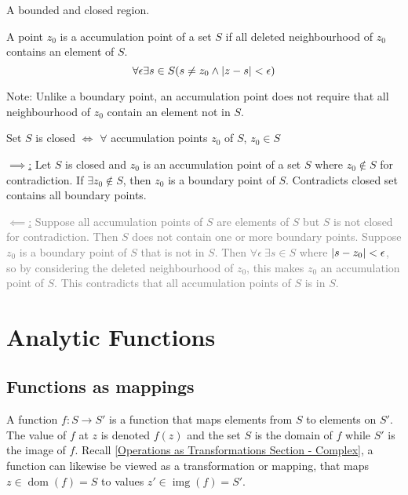 \documentclass[12pt, english]{book}
\makeatletter
\renewenvironment{proof}[1][\proofname]{\par
	\pushQED{\qed}%
	\normalfont \topsep6\p@\@plus6\p@\relax
	\list{}{%
		\settowidth{\leftmargin}{\itshape\proofname:\hskip\labelsep}%
		\setlength{\labelwidth}{0pt}%
		\setlength{\itemindent}{-\leftmargin}%
	}%
	\item[\hskip\labelsep\itshape#1\@addpunct{:}]\ignorespaces
}{%
	\popQED\endlist\@endpefalse
}
\makeatother
\begin{document}
	\begin{definition}
		A bounded and closed region.
	\end{definition}

	\begin{definition}
		\label{Accumulation/Limit Point Definition - Complex}
		A point $z_0$ is a accumulation point of a set $S$ if all deleted neighbourhood of $z_0$ contains an element of $S$. 
		$$\forall \epsilon \exists s \in S (s \neq z_0 \land \abs{z-s} < \epsilon)$$
	\end{definition}
	Note: Unlike a boundary point, an accumulation point does not require that all neighbourhood of $z_0$ contain an element not in $S$.
	
	\begin{theorem}
		Set $S$ is closed $\iff$ $\forall$ accumulation points $z_0$ of $S$, $z_0 \in S$
	\end{theorem}
	\begin{proof}
		\underline{$\implies$:}
		Let $S$ is closed and $z_0$ is an accumulation point of a set $S$ where $z_0 \notin S$ for contradiction. If $\exists z_0 \notin S$, then $z_0$ is a boundary point of $S$. Contradicts closed set contains all boundary points. 
		
		\textcolor{Grey}{
		\underline{$\impliedby$:}
		Suppose all accumulation points of $S$ are elements of $S$ but $S$ is not closed for contradiction. Then $S$ does not contain one or more boundary points. Suppose $z_0$ is a boundary point of $S$ that is not in $S$. Then $\forall \epsilon \ \exists s\in S$ where $\abs{s-z_0} < \epsilon$, so by considering the deleted neighbourhood of $z_0$, this makes $z_0$ an accumulation point of $S$. This contradicts that all accumulation points of $S$ is in $S$. 		
		}
	\end{proof}

	\chapter{Analytic Functions} \label{Analytic Functions Chapter - Complex}
	\section{Functions as mappings} \label{Functions as Mappings Section - Complex}
	A function $f: S \rightarrow S'$ is a function that maps elements from $S$ to elements on $S'$. The value of $f$ at $z$ is denoted $f(z)$ and the set $S$ is the domain of $f$ while $S'$ is the image of $f$. Recall \cref{Operations as Transformations Section - Complex}, a function can likewise be viewed as a transformation or mapping, that maps $z \in \operatorname{dom}(f) = S$ to values $z' \in \operatorname{img}(f) = S'$.
	
\end{document}

